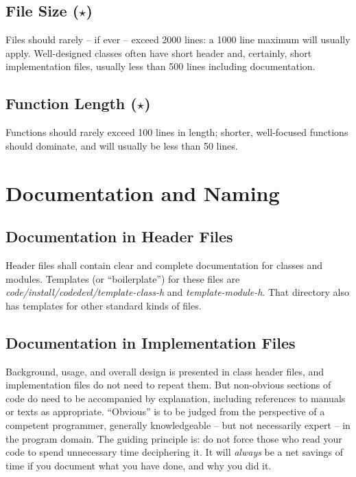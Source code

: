 \subsection {File Size ($\star$)}
Files should rarely -- if ever -- exceed 2000 lines:  a 1000 line
maximum will usually apply.  Well-designed classes often have short header
and, certainly, short implementation files, usually less than 500 lines
including documentation.
\subsection {Function Length ($\star$)}
Functions should rarely exceed 100 lines in length; shorter, well-focused
functions should dominate, and will usually be less than 50 lines.
\section {Documentation and Naming}
\subsection {Documentation in Header Files}
Header files shall contain clear and complete documentation for classes and
modules.  Templates (or ``boilerplate'') for these files are 
{\em code/install/codedevl/template-class-h} and {\em template-module-h}.
That directory also has templates for other standard kinds of files.
\subsection {Documentation in Implementation Files}
Background, usage, and overall design is presented in class header files,
and implementation files do not need to repeat them.  But non-obvious
sections of code do need to be accompanied by explanation, including 
references to manuals or texts as appropriate. ``Obvious'' is to be
judged from the perspective of a competent programmer, generally 
knowledgeable -- but not necessarily expert -- in the program domain.  The
guiding principle is:  do not force those who read your code to spend 
unnecessary time deciphering it.  It will {\em always} be a net savings
of time if you document what you have done, and why you did it.
